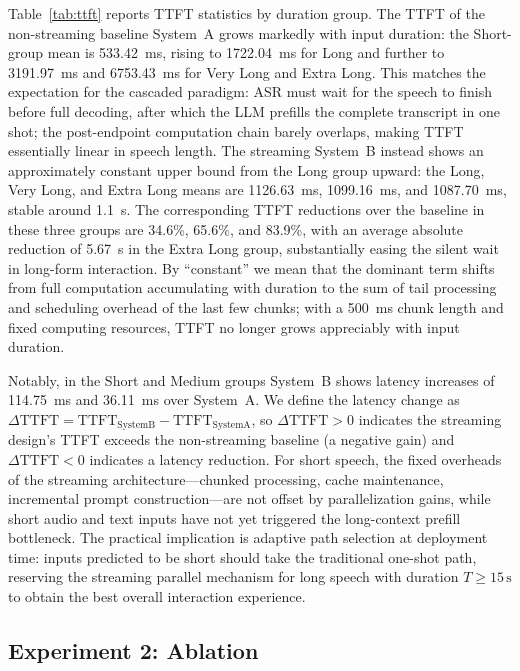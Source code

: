\documentclass[pdflatex,iicol,Numbered,sn-basic]{sn-jnl}%
\begin{document}
Table~\ref{tab:ttft} reports TTFT statistics by duration group. The TTFT of the non-streaming baseline System~A grows markedly with input duration: the Short-group mean is 533.42~ms, rising to 1722.04~ms for Long and further to 3191.97~ms and 6753.43~ms for Very Long and Extra Long. This matches the expectation for the cascaded paradigm: ASR must wait for the speech to finish before full decoding, after which the LLM prefills the complete transcript in one shot; the post-endpoint computation chain barely overlaps, making TTFT essentially linear in speech length. The streaming System~B instead shows an approximately constant upper bound from the Long group upward: the Long, Very Long, and Extra Long means are 1126.63~ms, 1099.16~ms, and 1087.70~ms, stable around 1.1~s. The corresponding TTFT reductions over the baseline in these three groups are 34.6\%, 65.6\%, and 83.9\%, with an average absolute reduction of 5.67~s in the Extra Long group, substantially easing the silent wait in long-form interaction. By ``constant'' we mean that the dominant term shifts from full computation accumulating with duration to the sum of tail processing and scheduling overhead of the last few chunks; with a 500~ms chunk length and fixed computing resources, TTFT no longer grows appreciably with input duration.

Notably, in the Short and Medium groups System~B shows latency increases of 114.75~ms and 36.11~ms over System~A. We define the latency change as $\Delta \mathrm{TTFT}=\mathrm{TTFT}_{\mathrm{SystemB}}-\mathrm{TTFT}_{\mathrm{SystemA}}$, so $\Delta \mathrm{TTFT}>0$ indicates the streaming design's TTFT exceeds the non-streaming baseline (a negative gain) and $\Delta \mathrm{TTFT}<0$ indicates a latency reduction. For short speech, the fixed overheads of the streaming architecture---chunked processing, cache maintenance, incremental prompt construction---are not offset by parallelization gains, while short audio and text inputs have not yet triggered the long-context prefill bottleneck. The practical implication is adaptive path selection at deployment time: inputs predicted to be short should take the traditional one-shot path, reserving the streaming parallel mechanism for long speech with duration $T\geq 15\,\mathrm{s}$ to obtain the best overall interaction experience.

\subsection{Experiment 2: Ablation}
\end{document}
